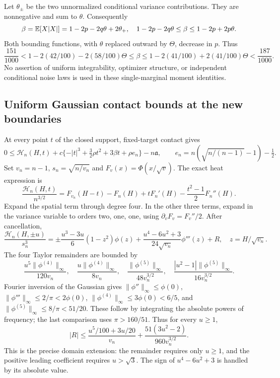 Let $\theta_\pm$ be the two unnormalized conditional variance contributions.
They are nonnegative and sum to $\theta$. Consequently
\[
 \beta=\mathbb E[X|X|]=1-2p-2q\theta+2\theta_+,
 \quad 1-2p-2q\theta\le\beta\le1-2p+2p\theta.
\]
Both bounding functions, with $\theta$ replaced outward by $\Theta$,
decrease in $p$. Thus
\begin{equation}
 \frac{151}{1000}<1-2(42/100)-2(58/100)\Theta
 \le\beta\le1-2(41/100)+2(41/100)\Theta<\frac{187}{1000}.
 \label{sn:beta}
\end{equation}
No assertion of uniform integrability, optimizer structure, or independent
conditional noise laws is used in these single-marginal moment identities.

\subsection{Uniform Gaussian contact bounds at the new boundaries}
At every point $t$ of the closed support, fixed-target contact gives
\begin{equation}
 0\le\mathcal H_n(H,t)+c\{-|t|^3+\tfrac32\rho t^2+3\beta t+\rho e_n\}
                  -n\mathfrak a,\qquad
 e_n=n(\sqrt{n/(n-1)}-1)-\tfrac12.
 \label{sn:contact}
\end{equation}
Set $v_n=n-1$, $s_n=\sqrt{n/v_n}$ and $F_v(x)=\Phi(x/\sqrt v)$.
The exact heat expression is
\[
 \frac{\mathcal H_n(H,t)}{n^{3/2}}
 =F_{v_n}(H-t)-F_n(H)+tF_n'(H)-\frac{t^2-1}{2}F_n''(H).
\]
Expand the spatial term through degree four. In the other three terms,
expand in the variance variable to orders two, one, one, using
$\partial_vF_v=F_v''/2$. After cancellation,
\[
 \frac{\mathcal H_n(H,\pm u)}{s_n^3}
 =\pm\frac{u^3-3u}{6}(1-z^2)\phi(z)
  +\frac{u^4-6u^2+3}{24\sqrt{v_n}}\phi'''(z)+R,
 \quad z=H/\sqrt{v_n}.
\]
The four Taylor remainders are bounded by
\[
 \frac{u^5\|\phi^{(4)}\|_\infty}{120v_n},\quad
 \frac{u\|\phi^{(4)}\|_\infty}{8v_n},\quad
 \frac{\|\phi^{(5)}\|_\infty}{48v_n^{3/2}},\quad
 \frac{|u^2-1|\|\phi^{(5)}\|_\infty}{16v_n^{3/2}}.
\]
Fourier inversion of the Gaussian gives
$\|\phi''\|_\infty\le\phi(0)$,
$\|\phi'''\|_\infty\le2/\pi<2\phi(0)$,
$\|\phi^{(4)}\|_\infty\le3\phi(0)<6/5$, and
$\|\phi^{(5)}\|_\infty\le8/\pi<51/20$.
These follow by integrating the absolute powers of frequency; the last
comparison uses $\pi>160/51$. Thus for every $u\ge1$,
\[
 |R|\le\frac{u^5/100+3u/20}{v_n}
          +\frac{51(3u^2-2)}{960v_n^{3/2}}.
\]
This is the precise domain extension: the remainder requires only
$u\ge1$, and the positive leading coefficient requires $u>\sqrt3$.
The sign of $u^4-6u^2+3$ is handled by its absolute value.

